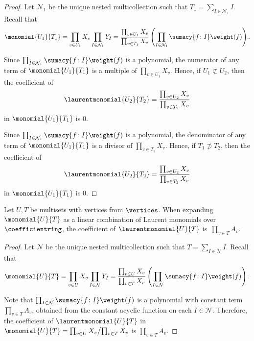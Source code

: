 \begin{proof}
    Let \(\mathcal{N}_1\) be the unique nested multicollection such that \(T_1 = \sum_{I \in \mathcal{N}_1} I\).
    Recall that
    \begin{equation*}
        \monomial{U_1}{T_1}
        = \prod_{v \in U_1} X_v \prod_{I \in \mathcal{N}_1} Y_I
        = \frac{\prod_{v \in U_1} X_v}{\prod_{v \in T_1} X_v}
        \left(
            \prod_{I \in \mathcal{N}_1} \sumacy{f \colon I} \weight(f)
        \right).
    \end{equation*} 

    Since \( \prod_{I \in \mathcal{N}_1} \sumacy{f \colon I} \weight(f) \) is a polynomial, the numerator of any term of \(\monomial{U_1}{T_1}\) is a multiple of \(\prod_{v \in U_1} X_v\).
    Hence, if \(U_1 \not\subset U_2\),
    then the coefficient of
    \begin{equation*}
		\laurentmonomial{U_2}{T_2} = \frac{\prod_{v \in U_2} X_v}{\prod_{v \in T_2} X_v}
	\end{equation*}
    in \(\monomial{U_1}{T_1}\) is \(0\).

    Since \( \prod_{I \in \mathcal{N}_1} \sumacy{f \colon I} \weight(f) \) is a polynomial,
    the denominator of any term of \(\monomial{U_1}{T_1}\) is a divisor of \(\prod_{v \in T_1} X_v\).
    Hence, if \(T_1 \not\supset T_2\),
    then the coefficient of
    \begin{equation*}
		\laurentmonomial{U_2}{T_2} = \frac{\prod_{v \in U_2} X_v}{\prod_{v \in T_2} X_v}
	\end{equation*}
    in \(\monomial{U_1}{T_1}\) is \(0\).
\end{proof}

\begin{lemm} \label{lemma:coefficient:UT}
    Let \(U, T\) be multisets with vertices from \(\vertices\).
    When expanding \(\monomial{U}{T}\) as a linear combination of Laurent monomials over \(\coefficientring\), the coefficient of \(\laurentmonomial{U}{T}\) is~\(\prod_{v \in T} A_v\).
\end{lemm}

\begin{proof}
    Let \(\mathcal{N}\) be the unique nested multicollection such that \(T = \sum_{I \in \mathcal{N}} I\).
    Recall that
    \begin{equation*}
        \monomial{U}{T}
        = \prod_{v \in U} X_v \prod_{I \in \mathcal{N}} Y_I 
        = \frac{\prod_{v \in U} X_v}{\prod_{v \in T} X_v}
        \left(
            \prod_{I \in \mathcal{N}} \sumacy{f \colon I} \weight(f)
        \right).
    \end{equation*}

    Note that \( \prod_{I \in \mathcal{N}} \sumacy{f \colon I} \weight(f) \) is a polynomial with constant term \(\prod_{v \in T} A_v\), obtained from the constant acyclic function on each \(I \in \mathcal{N}\).
    Therefore, the coefficient of \(\laurentmonomial{U}{T}\) in \(\monomial{U}{T} = {\prod_{v \in U} X_v} \big/ {\prod_{v \in T}X_v}\) is \(\prod_{v \in T} A_v\).
\end{proof}

